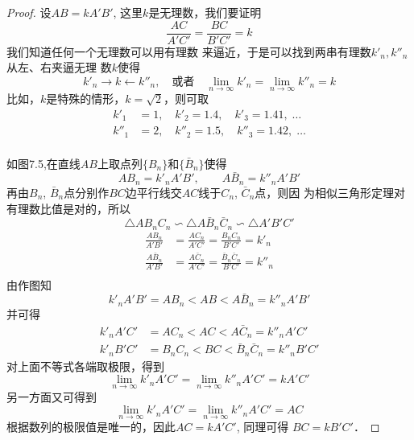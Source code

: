 \begin{proof}
设$AB=kA'B'$, 这里$k$是无理数，我们要证明
\[\frac{AC}{A'C'}=\frac{BC}{B'C'}=k\]
我们知道任何一个无理数可以用有理数
来逼近，于是可以找到两串有理数$k'_n,k''_n$从左、右夹逼无理
数$k$使得
\[k'_n\to k\leftarrow k''_n,\quad \text{或者}\quad \lim_{n\to\infty}k'_n=\lim_{n\to\infty}k''_n=k\]
比如，$k$是特殊的情形，$k=\sqrt{2}$，则可取
\[\begin{split}
    k'_1&=1,\quad     k'_2=1.4,\quad    k'_3=1.41,\;\ldots\\ 
    k''_1&=2,\quad     k''_2=1.5,\quad    k''_3=1.42,\;\ldots\\
\end{split}\]

\begin{figure}[htp]
    \centering
{}
    \caption{}
\end{figure}

如图7.5,在直线$AB$上取点列$\{B_n\}$和$\{\bar{B}_n\}$使得
\[AB_n=k'_nA'B',\qquad A\bar{B}_n=k''_n A'B'\]
再由$B_n$, $\bar{B}_n$点分别作$BC$边平行线交$AC$线于$C_n$, $\bar{C}_n$点，则因
为相似三角形定理对有理数比值是对的，所以
\[\triangle AB_nC_n\backsim \triangle A\bar{B}_n\bar{C}_n\backsim \triangle A'B'C'\]
\[\begin{split}
    \frac{AB_n}{A'B'}&=\frac{AC_n}{A'C'}=\frac{B_nC_n}{B'C'}=k'_n\\
    \frac{A\bar{B}_n}{A'B'}&=\frac{A\bar{C}_n}{A'C'}=\frac{\bar{B}_n\bar{C}_n}{B'C'}=k''_n\\
\end{split}\]
由作图知
\[k'_nA'B'=AB_n<AB<A\bar{B}_n=k''_nA'B'\]
并可得
\[\begin{split}
     k'_nA'C'&=AC_n<AC<A\bar{C}_n=k''_nA'C'\\
k'_nB'C'&=B_nC_n<BC<\bar{B}_n\bar{C}_n=k''_nB'C'
\end{split}\]
对上面不等式各端取极限，得到
\[\lim_{n\to\infty} k'_n A'C'  =  \lim_{n\to\infty}k''_n A'C'   =kA'C'\]
另一方面又可得到
\[\lim_{n\to\infty} k'_n A'C' = \lim_{n\to\infty}k''_n A'C'  =AC\]
根据数列的极限值是唯一的，因此$AC=kA'C'$, 同理可得
$BC=kB'C'$．
\end{proof}

